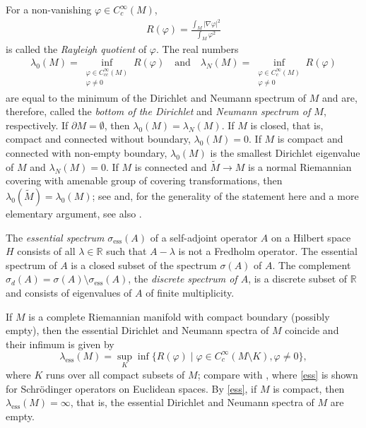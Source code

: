 \documentclass[a4paper,11pt]{amsart}
\numberwithin{equation}{section}
\theoremstyle{definition}
\def\R{\mathbb R}
\def\vf{\varphi}
\DeclareMathOperator{\ess}{ess}
\begin{document}
For a non-vanishing $\vf\in C^\infty_c(M)$,
\begin{align}\label{ray}
  R(\vf) = \frac{\int_M|\nabla\vf|^2}{\int_M\vf^2}
\end{align}
is called the \emph{Rayleigh quotient} of $\vf$.
The real numbers
\begin{align}\label{bot}
  \lambda_0(M) = \inf_{\substack{\vf\in C^\infty_{cc}(M)\\ \vf\ne0}} R(\vf)
  \quad\text{and}\quad
  \lambda_N(M) = \inf_{\substack{\vf\in C^\infty_c(M)\\ \vf\ne0}} R(\vf)
\end{align}
are equal to the minimum of the Dirichlet and Neumann spectrum of $M$ and are, therefore, called the \emph{bottom of the Dirichlet} and \emph{Neumann spectrum of $M$}, respectively.
If $\partial M=\emptyset$, then $\lambda_0(M)=\lambda_N(M)$.
If $M$ is closed, that is, compact and connected without boundary, $\lambda_0(M)=0$.
If $M$ is compact and connected with non-empty boundary, $\lambda_0(M)$ is the smallest Dirichlet eigenvalue of $M$ and $\lambda_N(M)=0$. 
If $M$ is connected and $\tilde{M}\to M$ is a normal Riemannian covering with amenable group of covering transformations, then $\lambda_0(\tilde M)=\lambda_0(M)$; see \cite{Br2} and, for the generality of the statement here and a more elementary argument, see also \cite{BMP}.

The \emph{essential spectrum} $\sigma_{\ess}(A)$ of a self-adjoint operator $A$ on a Hilbert space $H$ consists of all $\lambda\in\R$ such that $A-\lambda$ is not a Fredholm operator.
The essential spectrum of $A$ is a closed subset of the spectrum $\sigma(A)$ of $A$.
The complement $\sigma_d(A)=\sigma(A)\setminus\sigma_{\ess}(A)$, the \emph{discrete spectrum of $A$}, is a discrete subset of $\R$ and consists of eigenvalues of $A$ of finite multiplicity.

If $M$ is a complete Riemannian manifold with compact boundary (possibly empty),
then the  essential Dirichlet and Neumann spectra of $M$ coincide and their infimum is given by
\begin{equation}\label{ess}
  \lambda_{\ess}(M) = \sup_K\inf\{R(\vf)\mid \vf\in C^\infty_c(M\setminus K), \vf\ne0\},
\end{equation}
where $K$ runs over all compact subsets of $M$;
compare with \cite[Theorem 14.4]{HS}, where \eqref{ess} is shown for Schr\"odinger operators on Euclidean spaces.
By \eqref{ess}, if $M$ is compact, then $\lambda_{\ess}(M)=\infty$, that is, the essential Dirichlet and Neumann spectra of $M$ are empty.
\end{document}
